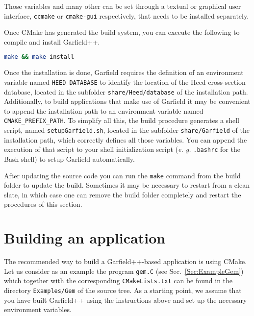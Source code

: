Those variables and many other can be set through a textual or graphical user interface, \texttt{ccmake} or \texttt{cmake-gui} respectively, that needs to be installed separately.

Once CMake has generated the build system, 
you can execute the following to compile and install Garfield++.

\begin{lstlisting}[language=bash]
make && make install
\end{lstlisting}

Once the installation is done, Garfield requires the definition of an 
environment variable named \texttt{HEED\_DATABASE} to identify the location 
of the Heed cross-section database, 
located in the subfolder \texttt{share/Heed/database} of the installation 
path. Additionally, to build applications that make use of Garfield 
it may be convenient to append the installation path to an environment 
variable named \texttt{CMAKE\_PREFIX\_PATH}. To simplify all this,
the build procedure generates a shell script, 
named \texttt{setupGarfield.sh}, located in the subfolder 
\texttt{share/Garfield} of the installation path, 
which correctly defines all those variables. 
You can append the execution of that script to your shell initialization 
script (\textit{e. g.} \texttt{.bashrc} for the Bash shell) to setup 
Garfield automatically.

After updating the source code you can run the \texttt{make} command 
from the build folder to update the build. 
Sometimes it may be necessary to restart from a clean slate, 
in which case one can remove the build folder completely and restart the procedures of this section.

\section{Building an application}
The recommended way to build a Garfield++-based application is 
using CMake. Let us consider as an example the program \texttt{gem.C} 
(see Sec.~\ref{Sec:ExampleGem}) 
which together with the corresponding \texttt{CMakeLists.txt} can be 
found in the directory \texttt{Examples/Gem} of the source tree. 
As a starting point, we assume that you have built Garfield++ using the 
instructions above and set up the necessary environment variables. 

